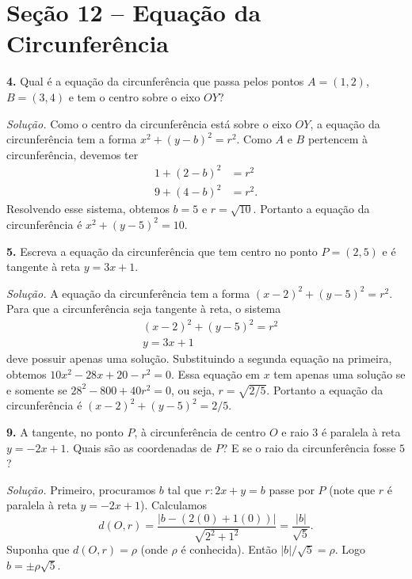 \documentclass[a4paper,11pt]{article}
\begin{document}
\section*{Seção 12 -- Equação da Circunferência}

\textbf{4.}
Qual é a equação da circunferência que passa pelos pontos $A = (1,2)$, $B = (3,4)$ e tem o centro sobre o eixo $OY$?

\vspace{\baselineskip}

\emph{Solução.}
Como o centro da circunferência está sobre o eixo $OY$, a equação da circunferência tem a forma $x^2 + (y-b)^2 = r^2$.
Como $A$ e $B$ pertencem à circunferência, devemos ter
\begin{align*}
  1 + (2 - b)^2 & = r^2 \\
  9 + (4 - b)^2 & = r^2.
\end{align*}
Resolvendo esse sistema, obtemos $b = 5$ e $r = \sqrt{10}$.
Portanto a equação da circunferência é $x^2 + (y - 5)^2 = 10$.

\vspace{\baselineskip}

\textbf{5.}
Escreva a equação da circunferência que tem centro no ponto $P = (2,5)$ e é tangente à reta $y = 3x + 1$.

\vspace{\baselineskip}

\emph{Solução.}
A equação da circunferência tem a forma $(x-2)^2 + (y-5)^2 = r^2$.
Para que a circunferência seja tangente à reta, o sistema
\begin{align*}
  & (x-2)^2 + (y-5)^2 = r^2 \\
  & y = 3x + 1
\end{align*}
deve possuir apenas uma solução.
Substituindo a segunda equação na primeira, obtemos $10x^2 - 28x + 20-r^2 = 0$.
Essa equação em $x$ tem apenas uma solução se e somente se $28^2 - 800 + 40r^2 = 0$, ou seja, $r = \sqrt{2/5}$.
Portanto a equação da circunferência é $(x-2)^2 + (y-5)^2 = 2/5$.

\vspace{\baselineskip}

\textbf{9.}
A tangente, no ponto $P$, à circunferência de centro $O$ e raio $3$ é paralela à reta $y = -2x + 1$.
Quais são as coordenadas de $P$?
E se o raio da circunferência fosse $5$?

\vspace{\baselineskip}

\emph{Solução.}
Primeiro, procuramos $b$ tal que $r: 2x + y = b$ passe por $P$ (note que $r$ é paralela à reta $y = -2x + 1$).
Calculamos
\[
  d(O,r) = \frac{|b - (2(0) + 1(0))|}{\sqrt{2^2 + 1^2}} = \frac{|b|}{\sqrt{5}}.
\]
Suponha que $d(O,r) = \rho$ (onde $\rho$ é conhecida).
Então $|b|/\sqrt{5} = \rho$.
Logo $b = \pm \rho \sqrt{5}$.
\end{document}
